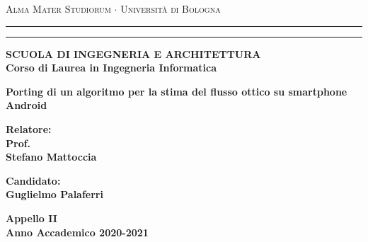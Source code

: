 

%
%

\begin{titlepage}
\begin{center}
{{\Large{\textsc{Alma Mater Studiorum $\cdot$ Universit\`a di
Bologna}}}} \rule[0.1cm]{15.8cm}{0.1mm}
\rule[0.5cm]{15.8cm}{0.6mm}
{\small{\bf SCUOLA DI INGEGNERIA E ARCHITETTURA\\
Corso di Laurea in Ingegneria Informatica }}
\end{center}
\vspace{35mm}
\begin{center}
{\LARGE{\bf Porting di un algoritmo per la stima del flusso ottico su smartphone Android}}\\
\end{center}
\vspace{50mm}
\par
\noindent
\begin{minipage}[t]{0.47\textwidth}
{\large{\bf Relatore:\\
Prof.\\
Stefano Mattoccia}}
\end{minipage}
\hfill
\begin{minipage}[t]{0.47\textwidth}\raggedleft
{\large{\bf Candidato:\\
Guglielmo Palaferri}}
\end{minipage}
\vspace{20mm}
\begin{center}
{\large{\bf Appello II\\%
Anno Accademico 2020-2021}}%
\end{center}
\end{titlepage}

%

